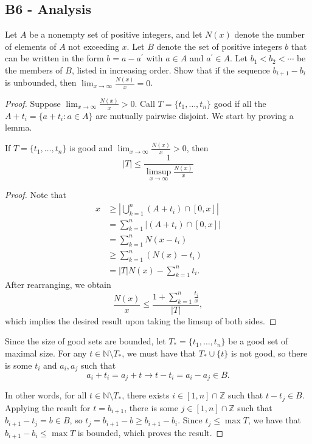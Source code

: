 \documentclass[11pt]{scrartcl}
\newcommand{\N}{\mathbb{N}}
\newcommand{\Z}{\mathbb{Z}}
\newcommand{\<}{\langle}
\renewcommand{\>}{\rangle}
\begin{document}
\subsection{B6 - Analysis} 
Let $A$ be a nonempty set of positive integers, and let $N(x)$ denote the number of elements of $A$ not exceeding $x$. Let $B$ denote the set of positive integers $b$ that can be written in the form $b=a-a^{\prime}$ with $a\in A$ and $a^{\prime}\in A$. Let $b_1<b_2<\cdots$ be the members of $B$, listed in increasing order. Show that if the sequence $b_{i+1}-b_i$ is unbounded, then $\lim_{x\to \infty}\frac{N(x)}{x}=0$.
\begin{proof}
Suppose $\lim_{x \to \infty} \frac{N(x)}{x} > 0$.  Call $T = \{t_1, \dots, t_n\}$ good if all the $A+t_i = \{a + t_i: a \in A\}$ are mutually pairwise disjoint.  We start by proving a lemma.
\begin{lemma}
If $T = \{t_1, \dots, t_n\}$ is good and $\lim_{x \to \infty} \frac{N(x)}{x} > 0$, then 
$$|T| \le \frac{1}{\limsup_{x \to \infty} \frac{N(x)}{x}}$$
\end{lemma}
\begin{proof}
Note that 
\begin{align*}
x &\ge \left | \bigcup_{k=1}^n (A + t_i) \cap [0, x]\right| \\
&= \sum_{k=1}^n |(A + t_i) \cap [0, x]| \\
&= \sum_{k=1}^n N(x - t_i) \\
&\ge \sum_{k=1}^n (N(x) - t_i) \\
& = |T| N(x) - \sum_{k=1}^{n} t_i.
\end{align*}
After rearranging, we obtain
$$\frac{N(x)}{x} \le \frac{1 + \sum_{k=1}^n \frac{t_i}{x}}{|T|},$$
which implies the desired result upon taking the limsup of both sides.  
\end{proof}
Since the size of good sets are bounded, let $T_* = \{t_1, \dots, t_n\}$ be a good set of maximal size.  For any $t \in \N \setminus T_*$, we must have that $T_* \cup \{t\}$ is not good, so there is some $t_i$ and $a_i, a_j$ such that 
$$a_i + t_i = a_j + t \rightarrow t - t_i = a_i - a_j \in B.$$

In other words, for all $t \in \N \setminus T_*$, there exists $i \in [1, n] \cap \Z$ such that $t - t_j \in B$.  Applying the result for $t = b_{i+1}$, there is some $j \in [1, n] \cap \Z$ such that $b_{i+1} - t_j = b \in B$, so $t_j = b_{i + 1} - b \ge b_{i + 1} - b_i$.  Since $t_j \le \max T$, we have that $b_{i + 1} - b_i \le \max T$ is bounded, which proves the result.
\end{proof}
\pagebreak
\end{document}
